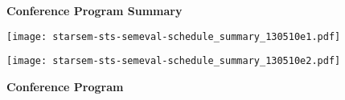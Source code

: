 \setlength{\parindent}{0in}
\setlength{\parskip}{2ex}
\renewcommand{\baselinestretch}{0.87}

\begin{center}
{\Large \bf
  Conference Program Summary
}
\end{center}
\vspace{-10mm}
\graphicspath{{./}{../templates/}{../templates/logo/}}
\texttt{[image: starsem-sts-semeval-schedule\_summary\_130510e1.pdf]}
\newpage
\graphicspath{{./}{../templates/}{../templates/logo/}}
\texttt{[image: starsem-sts-semeval-schedule\_summary\_130510e2.pdf]}
\newpage


\begin{center}
{\Large \bf
  Conference Program
}
\end{center}
\vspace{3mm}
